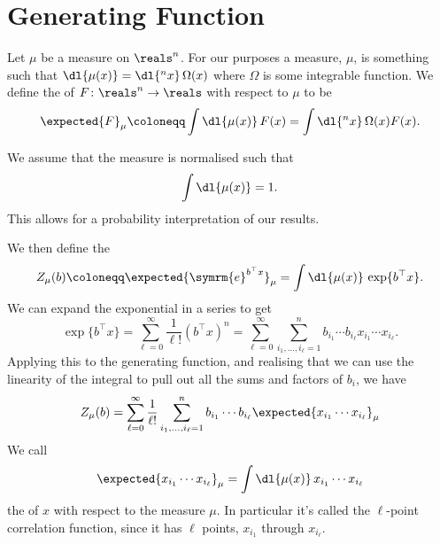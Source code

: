 \documentclass[fleqn]{NotesClass}
\newcommand{\e}{\symrm{e}}
\newcommand{\trans}{{\top}}
\begin{document}
    \section{Generating Function}
    Let \(\mu\) be a measure on \(\reals^n\).
    For our purposes a measure, \(\mu\), is something such that \(\dl{\mu(x)} = \dl{^nx}\, \Omega(x)\) where \(\Omega\) is some integrable function.
    We define the  of \(F \colon \reals^n \to \reals\) with respect to \(\mu\) to be
    \begin{equation}
        \expected{F}_\mu \coloneqq \int \dl{\mu(x)} \, F(x) = \int \dl{^nx} \, \Omega(x) F(x).
    \end{equation}
    
    We assume that the measure is normalised such that
    \begin{equation}
        \int \dl{\mu(x)} = 1.
    \end{equation}
    This allows for a probability interpretation of our results.
    
    We then define the 
    \begin{equation}
        Z_\mu(b) \coloneqq \expected{\e^{b^\trans x}}_\mu = \int \dl{\mu(x)} \, \exp\{b^\trans x\}.
    \end{equation}
    We can expand the exponential in a series to get
    \begin{equation}
        \exp\{b^\trans x\} = \sum_{\ell = 0}^{\infty} \frac{1}{\ell!} (b^\trans x)^n = \sum_{\ell = 0}^{\infty} \sum_{i_1, \dotsc, i_{\ell} = 1}^{n} b_{i_1}\dotsm b_{i_\ell} x_{i_1} \dotsm x_{i_\ell}.
    \end{equation}
    Applying this to the generating function, and realising that we can use the linearity of the integral to pull out all the sums and factors of \(b_i\), we have
    \begin{equation}
        Z_\mu(b) = \sum_{\ell = 0}^{\infty} \frac{1}{\ell!} \sum_{i_1, \dotsc, i_\ell = 1}^{n} b_{i_1} \dotsm b_{i_\ell} \expected{x_{i_1} \dotsm x_{i_\ell}}_\mu
    \end{equation}
    We call
    \begin{equation}
        \expected{x_{i_1} \dotsm x_{i_\ell}}_\mu = \int \dl{\mu(x)} \, x_{i_1} \dotsm x_{i_\ell}
    \end{equation}
    the  of \(x\) with respect to the measure \(\mu\).
    In particular it's called the \(\ell\)-point correlation function, since it has \(\ell\) points, \(x_{i_1}\) through \(x_{i_\ell}\).
    
\end{document}
